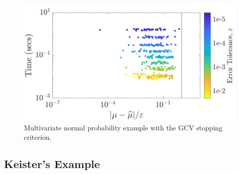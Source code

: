 \documentclass[graybox,footinfo]{svmult}
\begin{document}
\begin{figure}
\centering
\includegraphics[width=0.95\linewidth]{"figures/Sobol/Sobol_MVN_guaranteed_time_GCV__d2_r1_2019-Sep-1"}
\caption[Sobol: MVN guaranteed: GCV]{Multivariate normal probability example with the GCV stopping criterion.}
\label{fig:Sobol-mvn-guaranteed-GCV}
\end{figure}






\subsection{Keister's Example}
\end{document}
